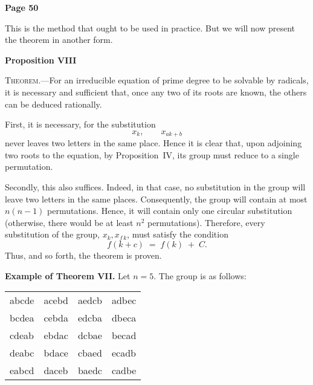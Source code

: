\documentclass{article}
\begin{document}
\newpage

\centerline{\textbf{Page 50}}

\medskip

This is the method that ought to be used in practice. But we will now present the theorem in another form.

\medskip
\noindent
\textbf{Proposition VIII}

\noindent
\textsc{Theorem.}---For an irreducible equation of prime degree to be solvable by radicals, it is necessary and sufficient that, once any two of its roots are known, the others can be deduced rationally.

\medskip
\noindent
First, it is necessary, for the substitution 
\[
x_{k}, \quad\quad x_{ak + b}
\]
never leaves two letters in the same place. Hence it is clear that, upon adjoining two roots to the equation, by Proposition~IV, its group must reduce to a single permutation.

\noindent
Secondly, this also suffices. Indeed, in that case, no substitution in the group will leave two letters in the same places. Consequently, the group will contain at most $n(n-1)$ permutations. Hence, it will contain only one circular substitution (otherwise, there would be at least $n^{2}$ permutations). Therefore, every substitution of the group, $x_{k}, x_{f\,k}$, must satisfy the condition
\[
f(k + c) \;=\; f(k) \;+\; C.
\]
Thus, and so forth, the theorem is proven.

\medskip
\noindent
\textbf{Example of Theorem VII.}
Let $n = 5$. The group is as follows:
\begin{center}
\begin{tabular}{l|l|l|l}
abcde & acebd & aedcb & adbec \\
bcdea & cebda & edcba & dbeca \\
cdeab & ebdac & dcbae & becad \\
deabc & bdace & cbaed & ecadb \\
eabcd & daceb & baedc & cadbe \\
\end{tabular}
\end{center}
\end{document}
